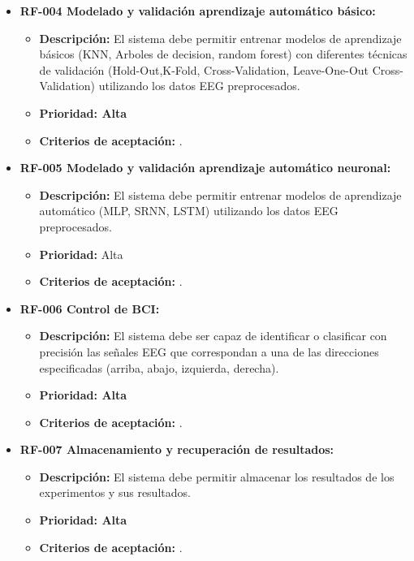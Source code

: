 \begin{itemize}
\item
  \textbf{RF-004 Modelado y validación aprendizaje automático básico:}

  \begin{itemize}
  \tightlist
  \item
   \textbf{Descripción:} El sistema debe permitir entrenar modelos de aprendizaje básicos (KNN, Arboles de decision, random forest) con diferentes técnicas de validación (Hold-Out,K-Fold, Cross-Validation, Leave-One-Out Cross-Validation) utilizando los datos EEG preprocesados.
  \item  
   \textbf{Prioridad: Alta}
  \item  
   \textbf{Criterios de aceptación:} .
	\textbf{}
  \end{itemize}


\item
  \textbf{RF-005 Modelado y validación aprendizaje automático neuronal:}
  
  \begin{itemize}
  \tightlist
  \item
   \textbf{Descripción:} El sistema debe permitir entrenar modelos de aprendizaje automático (MLP, SRNN, LSTM) utilizando los datos EEG preprocesados.
  \item  
   \textbf{Prioridad:} Alta
  \item  
   \textbf{Criterios de aceptación:} .
  \end{itemize}


\item
  \textbf{RF-006 Control de BCI:}

  \begin{itemize}
  \tightlist
  \item
   \textbf{Descripción:} El sistema debe ser capaz de identificar o clasificar con precisión las señales EEG que correspondan a una de las direcciones especificadas (arriba, abajo, izquierda, derecha).
  \item  
   \textbf{Prioridad: Alta}
  \item  
   \textbf{Criterios de aceptación:} .
  \end{itemize}


\item
  \textbf{RF-007 Almacenamiento y recuperación de resultados:}

  \begin{itemize}
  \tightlist
  \item
   \textbf{Descripción:} El sistema debe permitir almacenar los resultados de los experimentos y sus resultados.
  \item  
   \textbf{Prioridad: Alta}
  \item  
   \textbf{Criterios de aceptación:} .
  \end{itemize}


\end{itemize}
